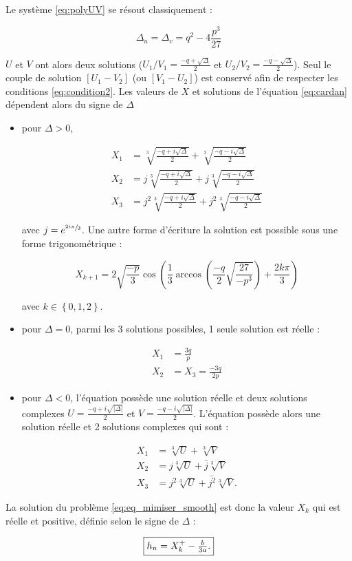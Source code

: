 Le système \ref{eq:polyUV} se résout classiquement : 

\begin{equation}
\Delta_u = \Delta_v = q^2-4\frac{p^3}{27}
\end{equation}

$U$ et $V$ ont alors deux solutions ($U_1/V_1 = \frac{-q+\sqrt{\Delta}}{2}$ et $U_2/V_2 = \frac{-q-\sqrt{\Delta}}{2}$). Seul le couple de solution  $\left[U_1-V_2\right]$ (ou $\left[V_1-U_2\right]$) est conservé afin de respecter les conditions \ref{eq:condition2}. Les valeurs de $X$ et solutions de l'équation \ref{eq:cardan} dépendent alors du signe de $\Delta$

\begin{itemize}
\item pour $\Delta >0$, 

\begin{subequations}
\begin{align}
X_1 &= \sqrt[3]{\frac{-q+i\sqrt{\Delta}}{2}}+\sqrt[3]{\frac{-q-i\sqrt{\Delta}}{2}}\\
X_2 &= j\sqrt[3]{\frac{-q+i\sqrt{\Delta}}{2}}+j\sqrt[3]{\frac{-q-i\sqrt{\Delta}}{2}}\\
X_3 &= j^2\sqrt[3]{\frac{-q+i\sqrt{\Delta}}{2}}+j^2\sqrt[3]{\frac{-q-i\sqrt{\Delta}}{2}}
\end{align}
\end{subequations}

avec $j = e^{\sfrac{2i\pi}{3}}$. Une autre forme d'écriture la solution est possible sous une forme trigonométrique : 

\begin{equation}
X_{k+1} = 2\sqrt{\frac{-p}{3}} \cos \left(\frac{1}{3} \arccos\left(\frac{-q}{2}\sqrt{\frac{27}{-p^3}}\right) + \frac{2k\pi}{3}\right)
\end{equation}

avec $k \in \left\lbrace 0,1,2 \right\rbrace$.


\item pour $\Delta = 0$, parmi les 3 solutions possibles, 1 seule solution est réelle : 

\begin{subequations}
\begin{align}
X_1 &= \frac{3q}{p}\\
X_2 &= X_3 = \frac{-3q}{2p}
\end{align}
\end{subequations}

\item pour $\Delta < 0$, l'équation possède une solution réelle et deux solutions complexes
$U =  \frac{-q+i\sqrt{\vert \Delta \vert}}{2}$ et $V = \frac{-q-i\sqrt{\vert \Delta \vert}}{2}$. L'équation possède alors une solution réelle et 2 solutions complexes qui sont 
: 

\begin{subequations}
\begin{align}
X_1 &= \sqrt[3]{U}+\sqrt[3]{V}\\
X_2 &= j\sqrt[3]{U}+\bar{j}\sqrt[3]{V}\\
X_3 &= j^2\sqrt[3]{U}+\bar{j^2}\sqrt[3]{V}.
\end{align}
\end{subequations}
\end{itemize}

La solution du problème \ref{eq:eq_mimiser_smooth} est donc la valeur $X_k$ qui est réelle et positive, définie selon le signe de $\Delta$ : 

\begin{equation}
\fbox{$
h_n = X_{k}^+-\frac{b}{3a}.
$}
\end{equation}